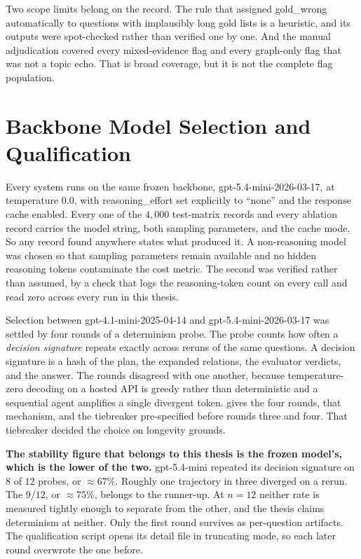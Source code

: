 Two scope limits belong on the record. The rule that assigned
\textsf{gold\_wrong} automatically to questions with implausibly long gold lists
is a heuristic, and its outputs were spot-checked rather than verified one by
one. And the manual adjudication covered every mixed-evidence flag and every
graph-only flag that was not a topic echo. That is broad coverage, but it is not
the complete flag population.

\section{Backbone Model Selection and Qualification}\label{sec:backbone}

Every system runs on the same frozen backbone, \textsf{gpt-5.4-mini-2026-03-17},
at temperature $0.0$, with \textsf{reasoning\_effort} set explicitly to
\textsf{``none''} and the response cache enabled. Every one of the $4{,}000$
test-matrix records and every ablation record carries the model string, both
sampling parameters, and the cache mode. So any record found anywhere states
what produced it. A non-reasoning model was chosen so that sampling parameters
remain available and no hidden reasoning tokens contaminate the cost metric. The
second was verified rather than assumed, by a check that logs the
reasoning-token count on every call and read zero across every run in this
thesis.

Selection between \textsf{gpt-4.1-mini-2025-04-14} and
\textsf{gpt-5.4-mini-2026-03-17} was settled by four rounds of a determinism
probe. The probe counts how often a \emph{decision signature} repeats exactly
across reruns of the same questions. A decision signature is a hash of the plan,
the expanded relations, the evaluator verdicts, and the answer. The rounds
disagreed with one another, because temperature-zero decoding on a hosted API is
greedy rather than deterministic and a sequential agent amplifies a single
divergent token.  gives the four rounds, that mechanism, and
the tiebreaker pre-specified before rounds three and four. That tiebreaker
decided the choice on longevity grounds.

\textbf{The stability figure that belongs to this thesis is the frozen model's,
which is the lower of the two.} \textsf{gpt-5.4-mini} repeated its decision
signature on $8$ of $12$ probes, or $\approx 67\%$. Roughly one trajectory in
three diverged on a rerun. The $9/12$, or $\approx 75\%$, belongs to the
runner-up. At $n = 12$ neither rate is measured tightly enough to separate from
the other, and the thesis claims determinism at neither. Only the first round
survives as per-question artifacts. The qualification script opens its detail
file in truncating mode, so each later round overwrote the one before.

